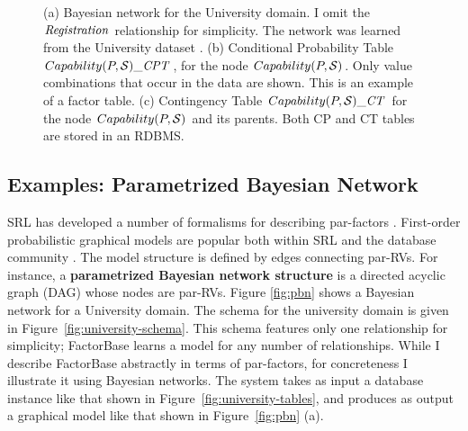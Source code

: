 \documentclass{sfuthesis}
\begin{document}
\begin{figure}[htbp] %
 \centering
{} 
\caption{(a) Bayesian network for the University domain. I  omit the $\reg$ relationship for simplicity. The network was learned from the University dataset \cite{bib:bbsite}.
(b) Conditional Probability Table $Capability(\P,\S)\_\cptable$, for the node $Capability(\P,\S)$. Only value combinations that occur in the data are shown. This is an example of a factor table. (c) Contingency Table $Capability(\P,\S)\_\cttable$ for the node $Capability(\P,\S)$ and its parents. Both CP and CT tables are stored in an RDBMS.}
 \label{fig:pbn}
\label{fig:ct-cp-table}
\end{figure}

\subsection{Examples: Parametrized Bayesian Network} \label{sec:examples} 
SRL has developed a number of formalisms for describing par-factors \cite{Kimmig2015}. 
First-order probabilistic graphical models
are popular both within SRL and the database community \cite{Kimmig2015,Wang2008}. The model structure is defined by edges connecting par-RVs. For instance, a \textbf{parametrized Bayesian network structure} is a directed acyclic graph (DAG) whose nodes are par-RVs.  Figure \ref{fig:pbn} shows a Bayesian network for a University domain. 
The schema for the university domain is given in Figure~\ref{fig:university-schema}. This schema features only one relationship for simplicity; FactorBase  learns a model for any number of relationships. While I  describe FactorBase  abstractly in terms of par-factors, for concreteness I  illustrate it using Bayesian networks. The system takes as input a database instance like that shown in Figure~\ref{fig:university-tables}, and produces as output a graphical model like that shown in Figure~\ref{fig:pbn} (a).  
\end{document}
